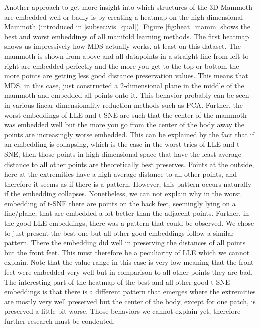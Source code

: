 Another approach to get more insight into which structures of the 3D-Mammoth are embedded well or badly is by creating a heatmap on the high-dimensional Mammoth (introduced in \ref{subsec:vis_qual}). Figure \ref{fig:heat_mamm} shows the best and worst embeddings of all manifold learning methods. The first heatmap shows us impressively how MDS actually works, at least on this dataset. The mammoth is shown from above and all datapoints in a straight line from left to right are embedded perfectly and the more you get to the top or bottom the more points are getting less good distance preservation values. This means that MDS, in this case, just constructed a 2-dimensional plane in the middle of the mammoth and embedded all points onto it. This behavior probably can be seen in various linear dimensionality reduction methods such as PCA. Further, the worst embeddings of LLE and t-SNE are such that the center of the mammoth was embedded well but the more you go from the center of the body away the points are increasingly worse embedded. This can be explained by the fact that if an embedding is collapsing, which is the case in the worst tries of LLE and t-SNE, then those points in high dimensional space that have the least average distance to all other points are theoretically best preserves. Points at the outside, here at the extremities have a high average distance to all other points, and therefore it seems as if there is a pattern. However, this pattern occurs naturally if the embedding collapses. Nonetheless, we can not explain why in the worst embedding of t-SNE there are points on the back feet, seemingly lying on a line/plane, that are embedded a lot better than the adjacent points. Further, in the good LLE embeddings, there was a pattern that could be observed. We chose to just present the best one but all other good embeddings follow a similar pattern. There the embedding did well in preserving the distances of all points but the front feet. This must therefore be a peculiarity of LLE which we cannot explain. Note that the value range in this case is very low meaning that the front feet were embedded very well but in comparison to all other points they are bad. The interesting part of the heatmap of the best and all other good t-SNE embeddings is that there is a different pattern that emerges where the extremities are mostly very well preserved but the center of the body, except for one patch, is preserved a little bit worse. Those behaviors we cannot explain yet, therefore further research must be condcuted.

